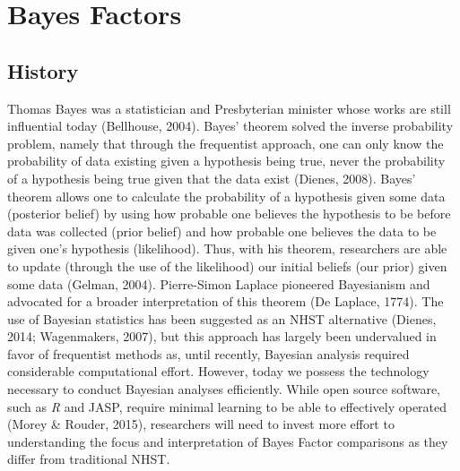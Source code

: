 \documentclass[english,man]{apa6}
\theoremstyle{definition}
\theoremstyle{definition}
\theoremstyle{definition}
\theoremstyle{remark}
\begin{document}
\section{Bayes Factors}\label{bayes-factors}

\subsection{History}\label{history-1}

Thomas Bayes was a statistician and Presbyterian minister whose works
are still influential today (Bellhouse, 2004). Bayes' theorem solved the
inverse probability problem, namely that through the frequentist
approach, one can only know the probability of data existing given a
hypothesis being true, never the probability of a hypothesis being true
given that the data exist (Dienes, 2008). Bayes' theorem allows one to
calculate the probability of a hypothesis given some data (posterior
belief) by using how probable one believes the hypothesis to be before
data was collected (prior belief) and how probable one believes the data
to be given one's hypothesis (likelihood). Thus, with his theorem,
researchers are able to update (through the use of the likelihood) our
initial beliefs (our prior) given some data (Gelman, 2004). Pierre-Simon
Laplace pioneered Bayesianism and advocated for a broader interpretation
of this theorem (De Laplace, 1774). The use of Bayesian statistics has
been suggested as an NHST alternative (Dienes, 2014; Wagenmakers, 2007),
but this approach has largely been undervalued in favor of frequentist
methods as, until recently, Bayesian analysis required considerable
computational effort. However, today we possess the technology necessary
to conduct Bayesian analyses efficiently. While open source software,
such as \emph{R} and JASP, require minimal learning to be able to
effectively operated (Morey \& Rouder, 2015), researchers will need to
invest more effort to understanding the focus and interpretation of
Bayes Factor comparisons as they differ from traditional NHST.
\end{document}
